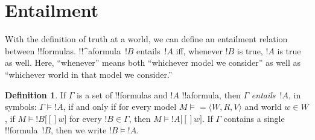 \documentclass[10pt,a4paper]{article}
\theoremstyle{plain}
\theoremstyle{definition}
\newtheorem{defn}[thm]{Definition}
\theoremstyle{remark}
\newenvironment{explain}{}{}
\newcommand*{\olfileid}[3]{}
\newcommand*{\olsection}[1]{\section*{#1}}
\providecommand{\Entails}{\mathrel{\models}}
\providecommand{\mSat}[3]{\ensuremath{#1 \models #2[#3]}}
\providecommand{\mModel}[2]{\ensuremath{#1 \models #2}}
\providecommand{\tuple}[1]{\langle #1 \rangle}
\begin{document}



\olfileid{nml}{syn}{ent}

\olsection{Entailment}

\begin{explain}
  With the definition of truth at a world, we can define an entailment
  relation between !!{formula}s. !!^a{formula}~$!B$ entails~$!A$ iff,
  whenever $!B$ is true, $!A$ is true as well. Here, ``whenever''
  means both ``whichever model we consider'' as well as ``whichever
  world in that model we consider.''
\end{explain}

\begin{defn}
  If $\Gamma$ is a set of !!{formula}s and $!A$ !!a{formula}, then
  $\Gamma$ \emph{entails}~$!A$, in symbols: $\Gamma \Entails !A$, if
  and only if for every model $\mModel{M} = \tuple{W, R, V}$ and world
  $w \in W$, if $\mSat{M}{!B}[w]$ for every $!B \in \Gamma$, then
  $\mSat{M}{!A}[w]$. If $\Gamma$ contains a single !!{formula}~$!B$,
  then we write $!B \Entails !A$.
\end{defn}
\end{document}
